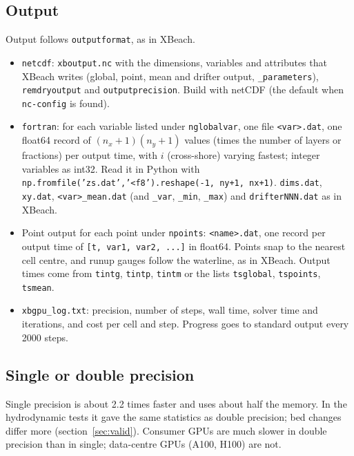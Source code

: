 \documentclass[11pt,a4paper]{article}
\newcommand{\code}[1]{\texttt{#1}}
\begin{document}
\subsection{Output}
Output follows \code{outputformat}, as in XBeach.
\begin{itemize}
\item \code{netcdf}: \code{xboutput.nc} with the dimensions, variables and attributes that XBeach writes
      (global, point, mean and drifter output, \code{\_parameters}), \code{remdryoutput} and
      \code{outputprecision}. Build with netCDF (the default when \code{nc-config} is found).
\item \code{fortran}: for each variable listed under \code{nglobalvar}, one file \code{<var>.dat}, one
      float64 record of $(n_x+1)(n_y+1)$ values (times the number of layers or fractions) per output time,
      with $i$ (cross-shore) varying fastest; integer variables as int32. Read it in Python with
      \code{np.fromfile('zs.dat','<f8').reshape(-1, ny+1, nx+1)}. \code{dims.dat}, \code{xy.dat},
      \code{<var>\_mean.dat} (and \code{\_var}, \code{\_min}, \code{\_max}) and \code{drifterNNN.dat} as in
      XBeach.
\item Point output for each point under \code{npoints}: \code{<name>.dat}, one record per output time of
      \code{[t, var1, var2, ...]} in float64. Points snap to the nearest cell centre, and runup gauges
      follow the waterline, as in XBeach. Output times come from \code{tintg}, \code{tintp},
      \code{tintm} or the lists \code{tsglobal}, \code{tspoints}, \code{tsmean}.
\item \code{xbgpu\_log.txt}: precision, number of steps, wall time, solver time and iterations, and cost per
      cell and step. Progress goes to standard output every 2000 steps.
\end{itemize}

\subsection{Single or double precision}
Single precision is about 2.2 times faster and uses about half the memory. In the hydrodynamic tests it
gave the same statistics as double precision; bed changes differ more (section~\ref{sec:valid}). Consumer GPUs are much slower in double precision than in
single; data-centre GPUs (A100, H100) are not.
\end{document}
